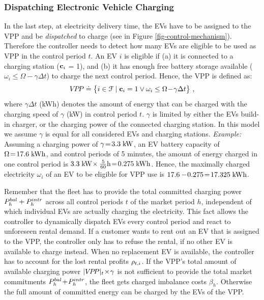 \documentclass[a4paper, 12pt]{article}
\begin{document}
\subsubsection{Dispatching Electronic Vehicle Charging}
\label{sec:orga78710a}
In the last step, at electricity delivery time, the EVs have to be assigned to
the VPP and be \emph{dispatched} to charge (see in Figure
\ref{fig-control-mechanism}). Therefore the controller needs to detect how many
EVs are eligible to be used as VPP in the control period \(t\). An EV \(i\) is
eligible if (a) it is connected to a charging station (\({\bf{c}}_{i}\) = 1), and (b) it has
enough free battery storage available
(\(\omega_{i}\leq\Omega\!-\!\gamma\Delta{t}\)) to charge the next control
period. Hence, the VPP is defined as:
\begin{equation}
    V\!P\!P \doteq \big\{i\in{\cal{F}} \;|\; {\bf{c}}_{i} = 1 \vee \omega_{i}\leq\Omega\!-\!\gamma\Delta{t}\big\} \text{ ,}
\end{equation}
where \(\gamma\Delta{t}\) (kWh) denotes the amount of energy that can be charged
with the charging speed of \(\gamma\) (kW) in control period \(t\). \(\gamma\) is
limited by either the EVs build-in charger, or the charging power of the
connected charging station. In this model we assume \(\gamma\) is equal for all
considered EVs and charging stations. \emph{Example:} Assuming a charging power of
\(\gamma\!=\!3.3\;\text{kW}\), an EV battery capacity of \(\Omega\!=\!17.6\;\text{kWh}\), and
control periods of 5 minutes, the amount of energy charged in one control period
is \(3.3\;\text{kW}\!\times\frac{5}{60}\text{h}\!=\!0.275\;\text{kWh}\). Hence, the maximally
charged electricity \(\omega_{i}\) of an EV to be eligible for VPP use is
\(17.6-\!0.275\!=\!17.325\;\text{kWh}\).

Remember that the fleet has to provide the total committed charging power
\(P^{bal}_{h}+P^{intr}_{h}\) across all control periods \(t\) of the market period \(h\),
independent of which individual EVs are actually charging the electricity. This
fact allows the controller to dynamically dispatch EVs every control period and
react to unforeseen rental demand. If a customer wants to rent out an EV that is
assigned to the VPP, the controller only has to refuse the rental, if no other
EV is available to charge instead. When no replacement EV is available, the
controller has to account for the lost rental profits \(\rho_{t,i}\). If the VPP's total
amount of available charging power \(|{V\!P\!P}|_{t}\!\times\!\gamma\) is not sufficient
to provide the total market commitments \(P^{bal}_{h}\!+\!P^{intr}_{h}\), the fleet gets
charged imbalance costs \(\beta_{h}\). Otherwise the full amount of committed
energy can be charged by the EVs of the VPP.
\end{document}
